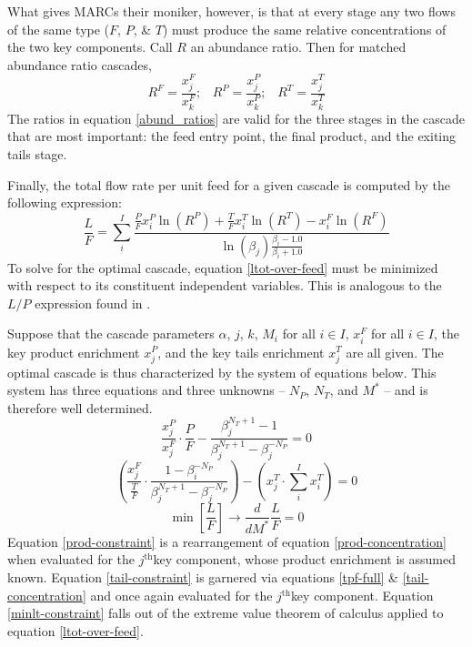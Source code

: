 \documentclass[preprint,12pt]{elsarticle}
\newcommand{\superscript}[1]{\ensuremath{^{\textrm{#1}}}}
\newcommand{\jth}[0]{$j$\superscript{th}}
\begin{document}
What gives MARCs their moniker, however, is that at every stage any two flows of 
the same type ($F$, $P$, \& $T$) must produce the same relative concentrations of 
the two key components.  Call $R$ an abundance ratio.  Then for matched abundance 
ratio cascades, 
\begin{equation}
R^F = \frac{x_j^F}{x_k^F}; \;\;\; R^P = \frac{x_j^P}{x_k^P}; \;\;\; 
R^T = \frac{x_j^T}{x_k^T}
\label{abund_ratios}
\end{equation}
The ratios in equation \ref{abund_ratios} are valid for the three stages in the 
cascade that are most important: the feed entry point, the final product, and the 
exiting tails stage.

Finally, the total flow rate per unit feed for a given cascade is computed by 
the following expression:
\begin{equation}
\frac{L}{F} = \sum_i^I \frac{\frac{P}{F}x_i^P\ln(R^P) + \frac{T}{F}x_i^T\ln(R^T) 
                                                      - x_i^F\ln(R^F)}
                            {\ln(\beta_j)\frac{\beta_i - 1.0}{\beta_i + 1.0}}
\label{ltot-over-feed}
\end{equation}
To solve for the optimal cascade, equation \ref{ltot-over-feed} must be minimized
with respect to its constituent independent variables.
This is analogous to the $L/P$ expression found in \cite{Wood1999}.

Suppose that the cascade parameters 
$\alpha$, 
$j$, $k$, 
$M_i$ for all $i\in I$, 
$x_i^F$ for all $i\in I$, 
the key product enrichment $x_j^P$, and the key 
tails enrichment $x_j^T$ are all given.  The optimal cascade is thus characterized by 
the system of equations below. This system has three equations and three unknowns --
$N_P$, $N_T$, and $M^*$ -- and is therefore well determined.
\begin{equation}
\frac{x_j^P}{x_j^F}\cdot\frac{P}{F} - \frac{\beta_j^{N_T+1} - 1}
                                           {\beta_j^{N_T+1} - \beta_j^{-N_P}} = 0
\label{prod-constraint}
\end{equation}
\begin{equation}
\left(\frac{x_j^F}{\frac{T}{F}} \cdot \frac{1 - \beta_i^{-N_P}}
                                           {\beta_j^{N_T+1} - \beta_j^{-N_P}} \right)
- \left(x_j^T\cdot\sum_i^{I} x_i^T\right) = 0
\label{tail-constraint}
\end{equation}
\begin{equation}
\min\left[\frac{L}{F}\right]\to \frac{d}{dM^*} \frac{L}{F} = 0
\label{minlt-constraint}
\end{equation}
Equation \ref{prod-constraint} is a rearrangement of equation \ref{prod-concentration}
when evaluated for the \jth key component, whose product enrichment is assumed
known.  Equation \ref{tail-constraint} is garnered via equations \ref{tpf-full} \&
\ref{tail-concentration} and once again evaluated for the \jth key component.
Equation \ref{minlt-constraint} falls out of the extreme value theorem of calculus
applied to equation \ref{ltot-over-feed}.
\end{document}
